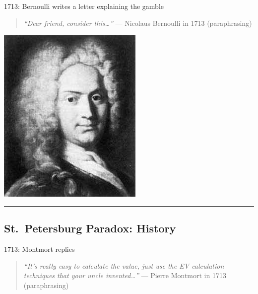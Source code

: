 \documentclass[
  letterpaper,
  DIV=11,
  numbers=noendperiod]{scrartcl}
\begin{document}
1713: Bernoulli writes a letter explaining the gamble

\begin{quote}
\emph{``Dear friend, consider this\ldots{}''} --- Nicolaus Bernoulli in
1713 (paraphrasing)
\end{quote}

\includegraphics[width=0.8\linewidth,height=\textheight,keepaspectratio]{figures/NBernoulli.jpeg}

\begin{center}\rule{0.5\linewidth}{0.5pt}\end{center}

\subsection{St.~Petersburg Paradox:
History}\label{st.-petersburg-paradox-history-1}

1713: Montmort replies

\begin{quote}
\emph{``It's really easy to calculate the value, just use the EV
calculation techniques that your uncle invented\ldots{}''} --- Pierre
Montmort in 1713 (paraphrasing)
\end{quote}
\end{document}
